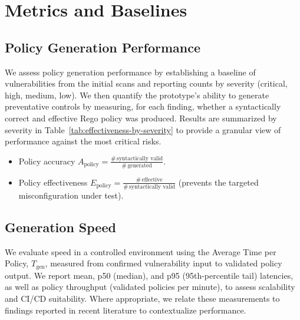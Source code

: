 \section{Metrics and Baselines}\label{sec:metrics-and-baselines}

\subsection{Policy Generation Performance}\label{sec:metrics-effectiveness}

We assess policy generation performance by establishing a baseline of vulnerabilities from the initial scans and reporting counts by severity (critical, high, medium, low). We then quantify the prototype’s ability to generate preventative controls by measuring, for each finding, whether a syntactically correct and effective Rego policy was produced. Results are summarized by severity in Table~\ref{tab:effectiveness-by-severity} to provide a granular view of performance against the most critical risks.

\begin{itemize}
	\item Policy accuracy $A_{\text{policy}} = \frac{\#\,\text{syntactically valid}}{\#\,\text{generated}}$.
	\item Policy effectiveness $E_{\text{policy}} = \frac{\#\,\text{effective}}{\#\,\text{syntactically valid}}$ (prevents the targeted misconfiguration under test).
\end{itemize}

\subsection{Generation Speed}\label{sec:metrics-speed}

We evaluate speed in a controlled environment using the Average Time per Policy, $T_{\text{gen}}$, measured from confirmed vulnerability input to validated policy output. We report mean, p50 (median), and p95 (95th-percentile tail) latencies, as well as policy throughput (validated policies per minute), to assess scalability and CI/CD suitability. Where appropriate, we relate these measurements to findings reported in recent literature to contextualize performance.

